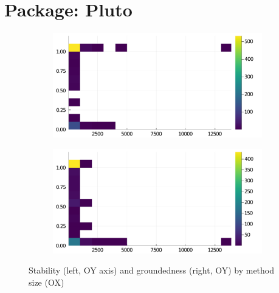\section*{Package: Pluto}
\begin{figure}[h]
     \begin{subfigure}[b]{0.49\textwidth}
       \includegraphics[width=\textwidth]{figs/all-package-graphs/Pluto-size-vs-stable.pdf}
     \end{subfigure}
     \begin{subfigure}[b]{0.49\textwidth}
       \includegraphics[width=\textwidth]{figs/all-package-graphs/Pluto-size-vs-grounded.pdf}
     \end{subfigure}
\caption{Stability (left, OY axis) and groundedness (right, OY) by method size (OX)}%
%
\label{figs:size:Pluto}
\end{figure}

